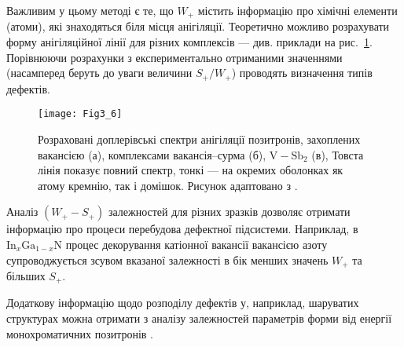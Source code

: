 Важливим у цьому методі є те, що $W_+$ містить
інформацію про хімічні елементи (атоми), які знаходяться біля місця анігіляції.
Теоретично можливо розрахувати форму анігіляційної лінії для
різних комплексів --- див. приклади на рис.~\ref{F36}.
Порівнюючи розрахунки з експериментально отриманими значеннями
(насамперед беруть до уваги величини $S_+/W_+$) проводять
визначення типів дефектів.

\begin{figure}[!b]
\center
\vspace{-5mm}
\texttt{[image: Fig3\_6]}
\vspace{-3mm}
\caption{Розраховані доплерівські
спектри анігіляції позитронів, захоплених
вакансією (а), комплексами вакансія--сурма (б),
$\mbox{V}-\mbox{Sb}_2$ (в),
Товста лінія показує повний спектр,
тонкі --- на окремих оболонках як атому кремнію,
так і домішок.
Рисунок адаптовано з \cite{PAS}.
}
\vspace{-3mm}
\label{F36}
\end{figure}

Аналіз $(W_+-S_+)$ залежностей для різних зразків
дозволяє отримати інформацію про процеси перебудова дефектної підсистеми.
Наприклад, в $\text{In}_x\text{Ga}_{1-x}\text{N}$
процес декорування катіонної вакансії
вакансією азоту супроводжується зсувом вказаної залежності в бік
менших значень $W_+$ та більших $S_+$.



Додаткову інформацію щодо розподілу дефектів
у, наприклад, шаруватих структурах
можна отримати з аналізу залежностей параметрів
форми від енергії монохроматичних позитронів \cite{Uedono_2014}.